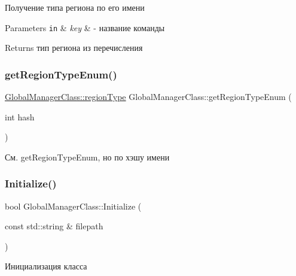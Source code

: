 Получение типа региона по его имени 


\begin{DoxyParams}[1]{Parameters}
\mbox{\tt in}  & {\em key} & -\/ название команды \\
\hline
\end{DoxyParams}
\begin{DoxyReturn}{Returns}
тип региона из перечисления 
\end{DoxyReturn}
\mbox{\label{class_global_manager_class_a4bf547b9b24567fbc3452a9ab4a86f11}} 
\subsubsection{\texorpdfstring{get\+Region\+Type\+Enum()}{getRegionTypeEnum()}\hspace{0.1cm}{\footnotesize\ttfamily [2/2]}}
{\footnotesize\ttfamily \hyperlink{class_global_manager_class_a794b4a5298c61f8d25d9da44b7826857}{Global\+Manager\+Class\+::region\+Type} Global\+Manager\+Class\+::get\+Region\+Type\+Enum (\begin{DoxyParamCaption}\item[{int}]{hash }\end{DoxyParamCaption})}



См. get\+Region\+Type\+Enum, но по хэшу имени 

\mbox{\label{class_global_manager_class_a6d85d6cbc5f93b995490d4ebe360245f}} 
\subsubsection{\texorpdfstring{Initialize()}{Initialize()}}
{\footnotesize\ttfamily bool Global\+Manager\+Class\+::\+Initialize (\begin{DoxyParamCaption}\item[{const std\+::string \&}]{filepath }\end{DoxyParamCaption})}



Инициализация класса 


